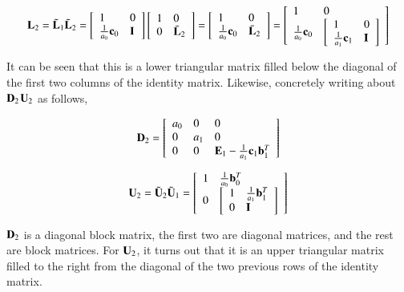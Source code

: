 \begin{eqnarray}
\mathbf{L}_2 =
\tilde{\mathbf{L}}_1\tilde{\mathbf{L}}_2 =
\left[\begin{array}{ll}1 & 0\\ \frac{1}{a_0}\mathbf{c}_0 & \mathbf{I}\end{array}\right]
\left[\begin{array}{ll}1 & 0\\ 0 & \bar{\mathbf{L}}_2\end{array}\right] =
\left[\begin{array}{ll}1 & 0\\ \frac{1}{a_0}\mathbf{c}_0 & \bar{\mathbf{L}}_2\end{array}\right] =
\left[\begin{array}{ll}1 & 0\\ \frac{1}{a_0}\mathbf{c}_0 & \left[\begin{array}{ll}1 & 0\\ \frac{1}{a_1}\mathbf{c}_1 & \mathbf{I}\end{array}\right]  \end{array}\right]
\end{eqnarray}

It can be seen that this is a lower triangular matrix filled below the diagonal of the first two columns of the identity matrix. Likewise, concretely writing about $\mathbf{D}_2$$\mathbf{U}_2$ as follows,

\begin{eqnarray}
\mathbf{D}_2 = \left[\begin{array}{lll}a_0 & 0 & 0\\ 0 & a_1 & 0 \\ 0 & 0 & \mathbf{E}_1-\frac{1}{a_1}\mathbf{c}_1\mathbf{b}_1^T\end{array}\right]
\end{eqnarray}

\begin{eqnarray}
\mathbf{U}_2 = \tilde{\mathbf{U}}_2\tilde{\mathbf{U}}_1 = \left[\begin{array}{ll}1 & \frac{1}{a_0}\mathbf{b}^T_0\\ 0 & \left[\begin{array}{ll}1 & \frac{1}{a_1}\mathbf{b}^T_1\\ 0 & \mathbf{I}\end{array}\right]  \end{array}\right]
\end{eqnarray}

$\mathbf{D}_2$ is a diagonal block matrix, the first two are diagonal matrices, and the rest are block matrices. For $\mathbf{U}_2$, it turns out that it is an upper triangular matrix filled to the right from the diagonal of the two previous rows of the identity matrix.

